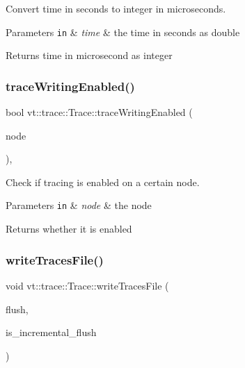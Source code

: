 Convert time in seconds to integer in microseconds. 


\begin{DoxyParams}[1]{Parameters}
\mbox{\tt in}  & {\em time} & the time in seconds as double\\
\hline
\end{DoxyParams}
\begin{DoxyReturn}{Returns}
time in microsecond as integer 
\end{DoxyReturn}
\mbox{\label{structvt_1_1trace_1_1_trace_ad2511af5eeb837db4360a6e30b12aebb}} 
\subsubsection{\texorpdfstring{trace\+Writing\+Enabled()}{traceWritingEnabled()}}
{\footnotesize\ttfamily bool vt\+::trace\+::\+Trace\+::trace\+Writing\+Enabled (\begin{DoxyParamCaption}\item[{\hyperlink{namespacevt_a866da9d0efc19c0a1ce79e9e492f47e2}{Node\+Type}}]{node }\end{DoxyParamCaption})\hspace{0.3cm}{\ttfamily [static]}, {\ttfamily [private]}}



Check if tracing is enabled on a certain node. 


\begin{DoxyParams}[1]{Parameters}
\mbox{\tt in}  & {\em node} & the node\\
\hline
\end{DoxyParams}
\begin{DoxyReturn}{Returns}
whether it is enabled 
\end{DoxyReturn}
\mbox{\label{structvt_1_1trace_1_1_trace_a7d0fc2fd82be06ecd24bf4e2b33ac52b}} 
\subsubsection{\texorpdfstring{write\+Traces\+File()}{writeTracesFile()}}
{\footnotesize\ttfamily void vt\+::trace\+::\+Trace\+::write\+Traces\+File (\begin{DoxyParamCaption}\item[{int}]{flush,  }\item[{bool}]{is\+\_\+incremental\+\_\+flush }\end{DoxyParamCaption})\hspace{0.3cm}{\ttfamily [private]}}



